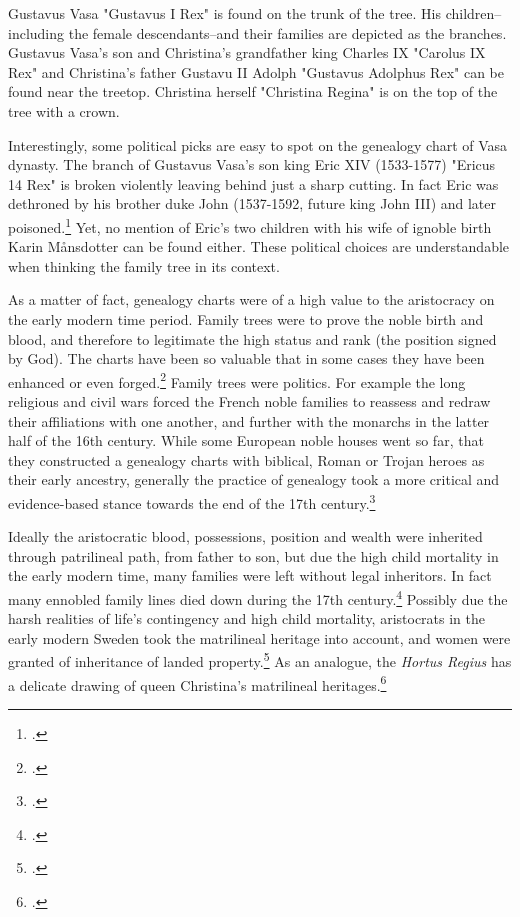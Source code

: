 Gustavus Vasa "Gustavus I Rex" is found on the trunk of the tree. His children–including the female descendants–and their families are depicted as the branches. Gustavus Vasa's son and Christina's grandfather king Charles IX "Carolus IX Rex" and Christina's father Gustavu II Adolph "Gustavus Adolphus Rex" can be found near the treetop. Christina herself "Christina Regina" is on the top of the tree with a crown. 

Interestingly, some political picks are easy to spot on the genealogy chart of Vasa dynasty. The branch of Gustavus Vasa's son king Eric XIV (1533-1577) "Ericus 14 Rex" is broken violently leaving behind just a sharp cutting. In fact Eric was dethroned by his brother duke John (1537-1592, future king John III) and later poisoned.\footcite[pp. 118-124.]{MelinEtAl} Yet, no mention of Eric's two children with his wife of ignoble birth Karin Månsdotter can be found either. These political choices are understandable when thinking the family tree in its context. 

As a matter of fact, genealogy charts were of a high value to the aristocracy on the early modern time period. Family trees were to prove the noble birth and blood, and therefore to legitimate the high status and rank (the position signed by God). The charts have been so valuable that in some cases they have been enhanced or even forged.\footcites[pp. 192-197]{friedrich18}[p. 150]{hakanenEtAll2020}[p. 158.]{lappalainen06} Family trees were politics. For example the long religious and civil wars forced the French noble families to reassess and redraw their affiliations with one another, and further with the monarchs in the latter half of the 16th century. While some European noble houses went so far, that they constructed a genealogy charts with biblical, Roman or Trojan heroes as their early ancestry, generally the practice of genealogy took a more critical and evidence-based stance towards the end of the 17th century.\footcite[pp. 192-197.]{friedrich18}

Ideally the aristocratic blood, possessions, position and wealth were inherited through patrilineal path, from father to son, but due the high child mortality in the early modern time, many families were left without legal inheritors. In fact many ennobled family lines died down during the 17th century.\footcite[pp. 158-160.]{lappalainen06} Possibly due the harsh realities of life's contingency and high child mortality, aristocrats in the early modern Sweden took the matrilineal heritage into account, and women were granted of inheritance of landed property.\footcites[p. 43]{lahtinen2020}[p. 40.]{lappalainen06} As an analogue, the \textit{Hortus Regius} has a delicate drawing of queen Christina's matrilineal heritages.\footcite{hortusregius}

